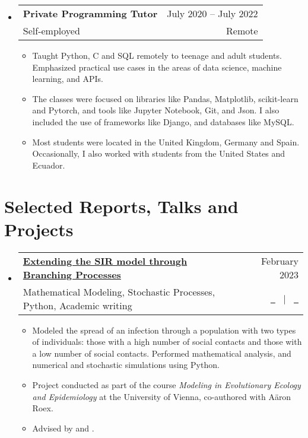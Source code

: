 \documentclass[a4paper,10pt]{article}
\makeatletter
\newcommand{\resumeQuadHeading}[4]{
  \item
  \begin{tabular*}{0.96\textwidth}[t]{l@{\extracolsep{\fill}}r}
    \textbf{#1} & \small #2 \\
    \small#3 & \small #4 \\
  \end{tabular*}
}
\newcommand{\resumeHeadingListStart}{
  \begin{itemize}[leftmargin=0.15in, label={}]
}
\newcommand{\resumeHeadingListEnd}{\end{itemize}}
\makeatother
\begin{document}
  
  \resumeHeadingListStart{}
    \resumeQuadHeading{Private Programming Tutor}{July 2020 – July 2022}
    {Self-employed}{Remote}
    \begin{itemize}[leftmargin=3em, itemsep=0.1em, topsep=2pt]
      \item \small Taught Python, C and SQL remotely to teenage and adult students. Emphasized practical use cases in the areas of data science, machine learning, and APIs.
      \item \small The classes were focused on libraries like Pandas, Matplotlib, scikit-learn and Pytorch, and tools like Jupyter Notebook, Git, and Json. I also included the use of frameworks like Django, and databases like MySQL. 
      \item \small Most students were located in the United Kingdom, Germany and Spain. Occasionally, I also worked with students from the United States and Ecuador.
    \end{itemize}
  \resumeHeadingListEnd{}



\section{Selected Reports, Talks and Projects}
  \resumeHeadingListStart{}
  \resumeQuadHeading{\href{https://github.com/loredanasandu/sir-branching-processes}{Extending the SIR model through Branching Processes}}{February 2023}{\small Mathematical Modeling, Stochastic Processes, Python, Academic writing}{\href{https://github.com/loredanasandu/sir-branching-processes/blob/main/Report_Extending-the-SIR-model-through-BP.pdf}{\faFileTextO \ \graydotuline{Report}} \ $|$ \ \href{https://github.com/loredanasandu/sir-branching-processes/blob/main/Code_Extending-the-SIR-model-through-BP.ipynb}{\faGithub \ \graydotuline{Code}}}
  \begin{itemize}[leftmargin=3em, itemsep=0.1em, topsep=2pt]
    \item \small Modeled the spread of an infection through a population with two types of individuals: those with a high number of social contacts and those with a low number of social contacts. Performed mathematical analysis, and numerical and stochastic simulations using Python.
    \item \small Project conducted as part of the course \textit{Modeling in Evolutionary Ecology and Epidemiology} at the University of Vienna, co-authored with Aäron Roex.
    \item \small Advised by \href{https://ufind.univie.ac.at/en/person.html?id=110430}{} and \href{https://ufind.univie.ac.at/en/person.html?id=59719/}{}.
  \end{itemize}
  \resumeHeadingListEnd{}
\end{document}
